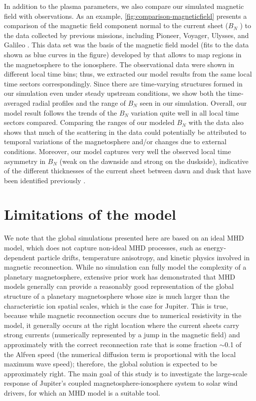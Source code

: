 In addition to the plasma parameters, we also compare our simulated magnetic field with observations. As an example, \ref{fig:comparison-magneticfield} presents a comparison of the magnetic field component normal to the current sheet ($B_N$ ) to the data collected by previous missions, including Pioneer, Voyager, Ulysses, and Galileo \cite{Vogt2011a}. This data set was the basis of the magnetic field model (fits to the data shown as blue curves in the figure) developed by \cite{Vogt2011a} that allows to map regions in the magnetosphere to the ionosphere. The observational data were shown in different local time bins; thus, we extracted our model results from the same local time sectors correspondingly. Since there are time‐varying structures formed in our simulation even under steady upstream conditions, we show both the time‐averaged radial profiles and the range of $B_N$ seen in our simulation. Overall, our model result follows the trends of the $B_N$ variation quite well in all local time sectors compared. Comparing the ranges of our modeled $B_N$ with the data also shows that much of the scattering in the data could potentially be attributed to temporal variations of the magnetosphere and/or changes due to external conditions. Moreover, our model captures very well the observed local time asymmetry in $B_N$ (weak on the dawnside and strong on the duskside), indicative of the different thicknesses of the current sheet between dawn and dusk that have been identified previously \cite{Khurana2005,Kivelson2002a}.

\section{Limitations of the model}
We note that the global simulations presented here are based on an ideal MHD model, which does not capture non-ideal MHD processes, such as energy‐dependent particle drifts, temperature anisotropy, and kinetic physics involved in magnetic reconnection. While no simulation can fully model the complexity of a planetary magnetosphere, extensive prior work has demonstrated that MHD models generally can provide a reasonably good representation of the global structure of a planetary magnetosphere whose size is much larger than the characteristic ion spatial scales, which is the case for Jupiter. This is true, because while magnetic reconnection occurs due to numerical resistivity in the model, it generally occurs at the right location where the current sheets carry strong currents (numerically represented by a jump in the magnetic field) and approximately with the correct reconnection rate that is some fraction $\sim$0.1 of the Alfven speed (the numerical diffusion term is proportional with the local maximum wave speed); therefore, the global solution is expected to be approximately right. The main goal of this study is to investigate the large‐scale response of Jupiter's coupled magnetosphere‐ionosphere system to solar wind drivers, for which an MHD model is a suitable tool.

